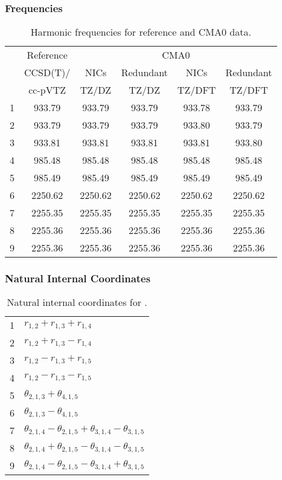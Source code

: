 \documentclass[10pt,oneside]{article}
\begin{document}
\begin{table}[h!]
\subsubsection*{Frequencies}
\centering
\caption{Harmonic frequencies for reference and CMA0 data.}
\begin{tabular}{cccccc}
\toprule
{} & Reference & \multicolumn{4}{c}{CMA0} \\
{} &  CCSD(T)/ &    NICs &  Redundant &    NICs & Redundant \\
{} &   cc-pVTZ &   TZ/DZ &      TZ/DZ &  TZ/DFT &    TZ/DFT \\
\midrule
1 &    933.79 &  933.79 &     933.79 &  933.78 &    933.79 \\
2 &    933.79 &  933.79 &     933.79 &  933.80 &    933.79 \\
3 &    933.81 &  933.81 &     933.81 &  933.81 &    933.80 \\
4 &    985.48 &  985.48 &     985.48 &  985.48 &    985.48 \\
5 &    985.49 &  985.49 &     985.49 &  985.49 &    985.49 \\
6 &   2250.62 & 2250.62 &    2250.62 & 2250.62 &   2250.62 \\
7 &   2255.35 & 2255.35 &    2255.35 & 2255.35 &   2255.35 \\
8 &   2255.36 & 2255.36 &    2255.36 & 2255.36 &   2255.36 \\
9 &   2255.36 & 2255.36 &    2255.36 & 2255.36 &   2255.36 \\
\bottomrule
\end{tabular}
\end{table}

\begin{table}[h!]
\subsubsection*{Natural Internal Coordinates}
\centering
\caption{Natural internal coordinates for .}
\small
\begin{tabular}{ll}
\toprule
  1   & $r_{1,2} + r_{1,3} + r_{1,4}$ \\
  2   & $r_{1,2} + r_{1,3} - r_{1,4}$ \\
  3   & $r_{1,2} - r_{1,3} + r_{1,5}$ \\
  4   & $r_{1,2} - r_{1,3} - r_{1,5}$ \\
  5   & $\theta_{2,1,3} + \theta_{4,1,5}$ \\
  6   & $\theta_{2,1,3} - \theta_{4,1,5}$ \\
  7   & $\theta_{2,1,4} - \theta_{2,1,5} + \theta_{3,1,4} - \theta_{3,1,5}$ \\
  8   & $\theta_{2,1,4} + \theta_{2,1,5} - \theta_{3,1,4} - \theta_{3,1,5}$ \\
  9   & $\theta_{2,1,4} - \theta_{2,1,5} - \theta_{3,1,4} + \theta_{3,1,5}$ \\
\bottomrule
\end{tabular}
\end{table}
\end{document}
